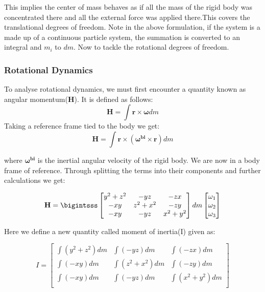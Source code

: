 \documentclass[12pt, letterpaper]{article}
\begin{document}
This implies the center of mass behaves as if all the mass of the rigid body was concentrated there and all the external force was applied there.This covers the translational degrees of freedom. Note in the above formulation, if the system is a made up of a continuous particle system, the summation is converted to an integral and $m_i$ to $dm$. Now to tackle the rotational degrees of freedom.

\subsubsection{Rotational Dynamics}

To analyse rotational dynamics, we must first encounter a quantity known as angular momentum($\mathbf{H}$). It is defined as follows:
\begin{displaymath}
\mathbf{H} = \int \mathbf{r} \times \mathbf{\omega} dm 
\end{displaymath}
Taking a reference frame tied to the body we get:
\begin{displaymath}
\mathbf{H} = \int \mathbf{r} \times (\mathbf{\omega^{bi}} \times \mathbf{r}) dm 
\end{displaymath}

where $\mathbf{\omega^{bi}}$ is the inertial angular velocity of the rigid body. We are now in a body frame of reference. Through splitting the terms into their components and further calculations we get:

\begin{displaymath}
\mathbf{H} = \bigintsss
	\begin{bmatrix}
	y^2 + z^2 & -yz &  -zx\\
	 -xy &  z^2 + x^2 &  -zy\\
	 -xy & -yz & x^2 + y^2\\
	\end{bmatrix}
	dm
	\begin{bmatrix}
	\omega_1\\
	\omega_2\\
	\omega_3\\
	\end{bmatrix}
\end{displaymath}

Here we define a new quantity called moment of inertia(I) given as:

\begin{displaymath}
	I = 
	\begin{bmatrix}
	\int(y^2 + z^2)dm & \int(-yz)dm & \int(-zx)dm\\
	\int(-xy)dm & \int(z^2 + x^2)dm & \int(-zy)dm\\
	\int(-xy)dm & \int(-yz)dm & \int(x^2 + y^2)dm\\
	\end{bmatrix}
\end{displaymath}
\end{document}
